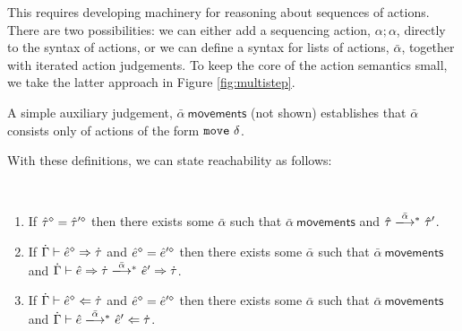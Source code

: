 This requires developing machinery for reasoning about sequences of
actions. There are two possibilities: we can either add a sequencing
action, $\alpha; \alpha$, directly to the syntax of actions, or we can
define a syntax for lists of actions, $\bar{\alpha}$, together with
iterated action judgements. To keep the core of the action semantics small,
we take the latter approach in Figure \ref{fig:multistep}.

A simple auxiliary judgement, $\bar\alpha~\mathsf{movements}$ (not shown) establishes that $\bar\alpha$ consists only of actions of
the form $\mathtt{move}~\delta$.

With these definitions, we can state reachability as follows:

\begin{theorem}[Reachability]\label{thrm:reachability} ~
  \begin{enumerate}[itemsep=0px,partopsep=0px,topsep=0px]
  \item If $\hat{\tau}^{\diamond}=\hat{\tau}'^{\diamond}$ then there exists some
    $\bar\alpha$ such that $\bar{\alpha}~\mathsf{movements}$ and
    $\performTypI{\ztau}{\bar\alpha}{\ztau'}$.

  \item If $\dot{\Gamma} \vdash \hat{e}^{\diamond} \Rightarrow \dot{\tau}$ and
    $\hat{e}^{\diamond}=\hat{e}'^{\diamond}$ then there exists some
    $\bar{\alpha}$ such that $\bar{\alpha}~\mathsf{movements}$ and
    $\performSynI{\hGamma}{\zexp}{\htau}{\bar\alpha}{\zexp'}{\htau}$.

  \item If $\dot{\Gamma} \vdash \hat{e}^{\diamond} \Leftarrow \dot{\tau}$ and
    $\hat{e}^{\diamond}=\hat{e}'^{\diamond}$ then there exists some
    $\bar{\alpha}$ such that $\bar{\alpha}~\mathsf{movements}$ and
    $\performAnaI{\hGamma}{\zexp}{\htau}{\bar{\alpha}}{\zexp'}$.
  \end{enumerate}
\end{theorem}


